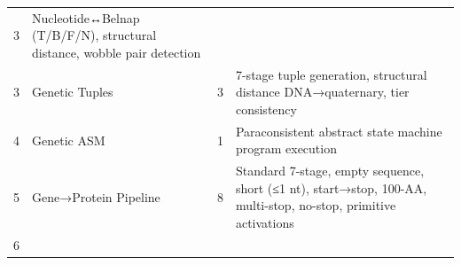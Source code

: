 \begin{longtable}[]{@{}llll@{}}
\begin{minipage}[t]{0.20\columnwidth}
3\strut
\end{minipage} & \begin{minipage}[t]{0.29\columnwidth}\raggedright
Nucleotide↔Belnap (T/B/F/N), structural distance, wobble pair
detection\strut
\end{minipage}\tabularnewline
\begin{minipage}[t]{0.09\columnwidth}\raggedright
3\strut
\end{minipage} & \begin{minipage}[t]{0.31\columnwidth}\raggedright
Genetic Tuples\strut
\end{minipage} & \begin{minipage}[t]{0.20\columnwidth}\raggedright
3\strut
\end{minipage} & \begin{minipage}[t]{0.29\columnwidth}\raggedright
7-stage tuple generation, structural distance DNA→quaternary, tier
consistency\strut
\end{minipage}\tabularnewline
\begin{minipage}[t]{0.09\columnwidth}\raggedright
4\strut
\end{minipage} & \begin{minipage}[t]{0.31\columnwidth}\raggedright
Genetic ASM\strut
\end{minipage} & \begin{minipage}[t]{0.20\columnwidth}\raggedright
1\strut
\end{minipage} & \begin{minipage}[t]{0.29\columnwidth}\raggedright
Paraconsistent abstract state machine program execution\strut
\end{minipage}\tabularnewline
\begin{minipage}[t]{0.09\columnwidth}\raggedright
5\strut
\end{minipage} & \begin{minipage}[t]{0.31\columnwidth}\raggedright
Gene→Protein Pipeline\strut
\end{minipage} & \begin{minipage}[t]{0.20\columnwidth}\raggedright
8\strut
\end{minipage} & \begin{minipage}[t]{0.29\columnwidth}\raggedright
Standard 7-stage, empty sequence, short (≤1 nt), start→stop, 100-AA,
multi-stop, no-stop, primitive activations\strut
\end{minipage}\tabularnewline
\begin{minipage}[t]{0.09\columnwidth}\raggedright
6\strut
\end{minipage} & \begin{minipage}[t]{0.31\columnwidth}\raggedright

\end{minipage}
\end{longtable}
